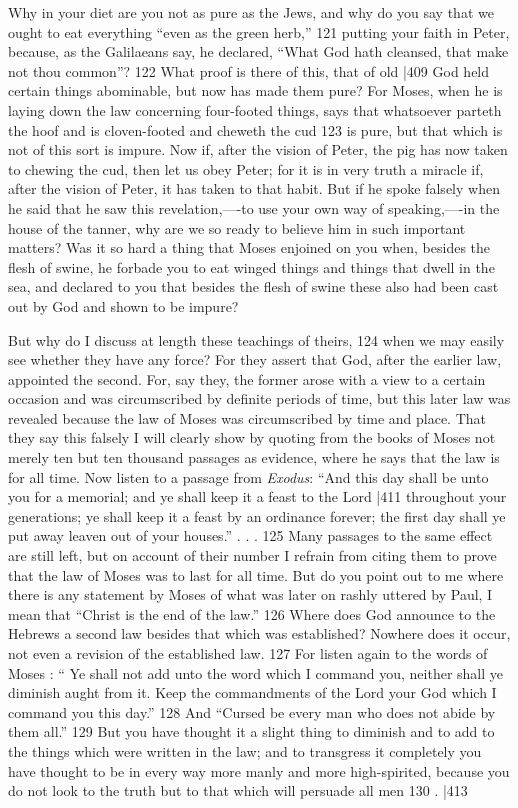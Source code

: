 Why in your diet are you not as pure as the Jews, and why do you say that we ought to eat everything ``even as the green herb,''
121 putting your faith in Peter, because, as the Galilaeans say, he declared, ``What God hath cleansed, that make not thou common''?
122 What proof is there of this, that of old |409
God held certain things abominable, but now has made them pure? For Moses, when he is laying down the law concerning four-footed things, says that whatsoever parteth the hoof and is cloven-footed and cheweth the cud
123 is pure, but that which is not of this sort is impure. Now if, after the vision of Peter, the pig has now taken to chewing the cud, then let us obey Peter; for it is in very truth a miracle if, after the vision of Peter, it has taken to that habit. But if he spoke falsely when he said that he saw this revelation,----to use your own way of speaking,----in the house of the tanner, why are we so ready to believe him in such important matters? Was it so hard a thing that Moses enjoined on you when, besides the flesh of swine, he forbade you to eat winged things and things that dwell in the sea, and declared to you that besides the flesh of swine these also had been cast out by God and shown to be impure?

But why do I discuss at length these teachings of theirs, 124 when we may easily see whether they have any force? For they assert that God, after the earlier law, appointed the second. For, say they, the former arose with a view to a certain occasion and was circumscribed by definite periods of time, but this later law was revealed because the law of Moses was circumscribed by time and place. That they say this falsely I will clearly show by quoting from the books of Moses not merely ten but ten thousand passages as evidence, where he says that the law is for all time. Now listen to a passage from \emph{Exodus}: ``And this day shall be unto you for a memorial; and ye shall keep it a feast to the Lord
|411 throughout your generations; ye shall keep it a feast by an ordinance forever; the first day shall ye put away leaven out of your houses.'' . . . 125 Many passages to the same effect are still left, but on account of their number I refrain from citing them to prove that the law of Moses was to last for all time. But do you point out to me where there is any statement by Moses of what was later on rashly uttered by Paul, I mean that ``Christ is the end of the law.''
126 Where does God announce to the Hebrews a second law besides that which was established? Nowhere does it occur, not even a revision of the established law. 127 For listen again to the words of Moses : `` Ye shall not add unto the word which I command you, neither shall ye diminish aught from it. Keep the commandments of the Lord your God which I command you this day.''
128 And ``Cursed be every man who does not abide by them all.''
129 But you have thought it a slight thing to diminish and to add to the things which were written in the law; and to transgress it completely you have thought to be in every way more manly and more high-spirited, because you do not look to the truth but to that which will persuade all
men 130 . |413

